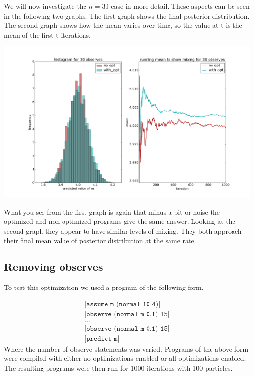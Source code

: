 \documentclass[a4paper]{article}
\begin{document}
We will now investigate the \(n = 30\) case in more detail. These aspects can be seen in the following two graphs. The first graph shows the final posterior distribution. The second graph shows how the mean varies over time, so the value at t is the mean of the first t iterations.

\centerline{\includegraphics[width=16cm]{images/merging_consecutive_observes_2.png}}

What you see from the first graph is again that minus a bit or noise the optimized and non-optimized programs give the same answer. Looking at the second graph they appear to have similar levels of mixing. They both approach their final mean value of posterior distribution at the same rate.




\subsection{Removing observes}

To test this optimization we used a program of the following form.

\[
	\begin{array}{l}
		\texttt{[assume m (normal 10 4)]} \\
		\texttt{[observe (normal m 0.1) 15]} \\
		\texttt{...} \\
		\texttt{[observe (normal m 0.1) 15]} \\
		\texttt{[predict m]}
	\end{array}
\]
Where the number of observe statements was varied. Programs of the above form were compiled with either no optimizations enabled or all optimizations enabled. The resulting programs were then run for 1000 iterations with 100 particles.
\end{document}
